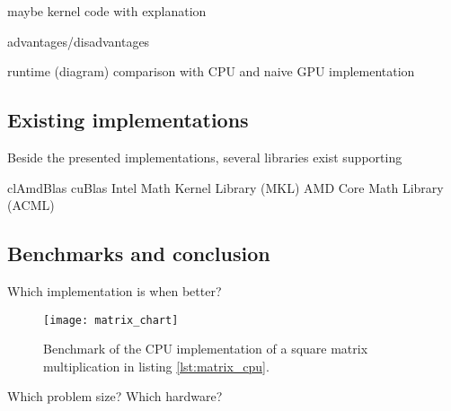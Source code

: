 maybe kernel code with explanation

advantages/disadvantages

runtime (diagram)
comparison with CPU and naive GPU implementation

\subsection{Existing implementations}

Beside the presented implementations, several libraries exist supporting 

clAmdBlas
cuBlas
Intel Math Kernel Library (MKL)
AMD Core Math Library (ACML)

\subsection{Benchmarks and conclusion}
Which implementation is when better?

\begin{figure}
\centering
\texttt{[image: matrix\_chart]}
\caption{Benchmark of the CPU implementation of a square matrix multiplication in listing \ref{lst:matrix_cpu}.}
\label{fig:matrix_chart}
\end{figure}

Which problem size?
Which hardware?

